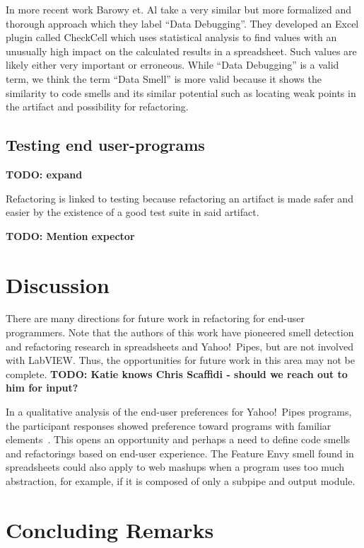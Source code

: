 \documentclass[10pt,conference,compsocconf]{IEEEtran}
\newcommand{\todo}[1]{\textbf{TODO: #1}}
\begin{document}
In more recent work Barowy et. Al \cite{barowy2014checkcell} take a very similar but more formalized and thorough approach which they label ``Data Debugging''.
They developed an Excel plugin called CheckCell which uses statistical analysis to find values with an unusually high impact on the calculated results in a spreadsheet.
Such values are likely either very important or erroneous.
While ``Data Debugging'' is a valid term, we think the term ``Data Smell'' is more valid because it shows the similarity to code smells and its similar potential such as locating weak points in the artifact and possibility for refactoring.

\subsection{Testing end user-programs}

\todo{expand}

Refactoring is linked to testing because refactoring an artifact is made safer and easier by the existence of a good test suite in said artifact.

\todo{Mention expector}

\section{Discussion}
\label{sec:discussion}

There are many directions for future work in refactoring for end-user programmers. Note that the authors of this work have pioneered smell detection and refactoring research in spreadsheets and Yahoo!\ Pipes, but are not involved with LabVIEW. Thus, the opportunities for future work in this area may not be complete.  \todo{Katie knows Chris Scaffidi - should we reach out to him for input?}


In a qualitative analysis of the end-user preferences for Yahoo!\ Pipes programs, the participant responses showed preference toward programs with familiar elements~\cite{Stolee2015}. This opens an opportunity and perhaps a need to define code smells and refactorings based on end-user experience. 
The Feature Envy smell found in spreadsheets could also apply to web mashups when a program uses too much abstraction, for example, if it is composed of only a subpipe and output module. 




\section{Concluding Remarks}
\label{sec:conclusions}

\newpage
\balance





\end{document}
